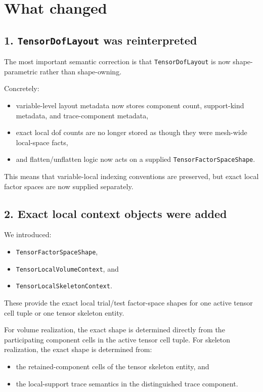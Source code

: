 \documentclass[11pt]{article}
\begin{document}
\section{What changed}

\subsection{1. \texttt{TensorDofLayout} was reinterpreted}

The most important semantic correction is that \texttt{TensorDofLayout} is now shape-parametric rather than shape-owning.

Concretely:
\begin{itemize}[leftmargin=*]
  \item variable-level layout metadata now stores component count, support-kind metadata, and trace-component metadata,
  \item exact local dof counts are no longer stored as though they were mesh-wide local-space facts,
  \item and flatten/unflatten logic now acts on a supplied \texttt{TensorFactorSpaceShape}.
\end{itemize}

This means that variable-local indexing conventions are preserved, but exact local factor spaces are now supplied separately.

\subsection{2. Exact local context objects were added}

We introduced:
\begin{itemize}[leftmargin=*]
  \item \texttt{TensorFactorSpaceShape},
  \item \texttt{TensorLocalVolumeContext}, and
  \item \texttt{TensorLocalSkeletonContext}.
\end{itemize}

These provide the exact local trial/test factor-space shapes for one active tensor cell tuple or one tensor skeleton entity.

For volume realization, the exact shape is determined directly from the participating component cells in the active tensor cell tuple.  For skeleton realization, the exact shape is determined from:
\begin{itemize}[leftmargin=*]
  \item the retained-component cells of the tensor skeleton entity, and
  \item the local-support trace semantics in the distinguished trace component.
\end{itemize}
\end{document}
